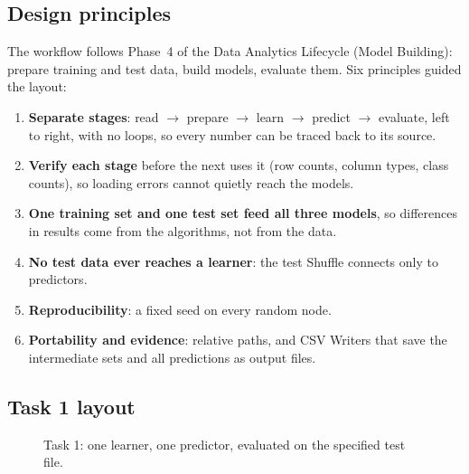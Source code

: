 \documentclass[11pt,a4paper]{article}
\begin{document}
\subsection{Design principles}
The workflow follows Phase~4 of the Data Analytics Lifecycle (Model Building): prepare training and test data,
build models, evaluate them. Six principles guided the layout:
\begin{enumerate}
  \item \textbf{Separate stages}: read $\rightarrow$ prepare $\rightarrow$ learn $\rightarrow$ predict $\rightarrow$ evaluate,
        left to right, with no loops, so every number can be traced back to its source.
  \item \textbf{Verify each stage} before the next uses it (row counts, column types, class counts), so loading
        errors cannot quietly reach the models.
  \item \textbf{One training set and one test set feed all three models}, so differences in results come from the
        algorithms, not from the data.
  \item \textbf{No test data ever reaches a learner}: the test Shuffle connects only to predictors.
  \item \textbf{Reproducibility}: a fixed seed on every random node.
  \item \textbf{Portability and evidence}: relative paths, and CSV Writers that save the intermediate sets and all
        predictions as output files.
\end{enumerate}

\subsection{Task 1 layout}
\begin{figure}[H]\centering
{}
\caption{Task 1: one learner, one predictor, evaluated on the specified test file.}
\end{figure}
\end{document}
